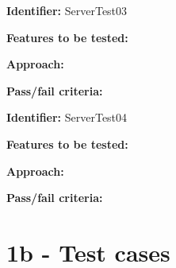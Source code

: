 \documentclass[a4paper,12pt]{memoir}
\newcommand{\testdesign}[4]
{
\begin{framed}
\begin{description}
\item \textbf{Identifier:} #1
\item \textbf{Features to be tested:} #2
\item \textbf{Approach:} #3
\item \textbf{Pass/fail criteria:} #4
\end{description}
\end{framed}
}
\begin{document}
\testdesign
{ServerTest03} %
{} %
{} %
{} %

\testdesign
{ServerTest04} %
{} %
{} %
{} %


\section*{1b - Test cases}
\end{document}
